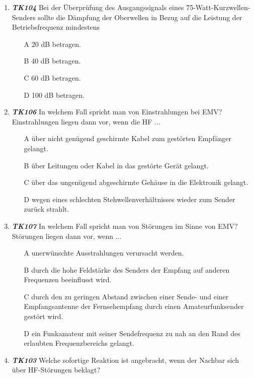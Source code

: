 \begin{enumerate} 
	\item \emph{\textbf{TK104}} Bei der Überprüfung des Ausgangssignals eines 75-Watt-Kurzwellen-Senders sollte die Dämpfung der Oberwellen in Bezug auf die Leistung der Betriebsfrequenz mindestens
	\begin{enumerate}
	\itemsep1pt\parskip0pt
		\item[A] 20 dB betragen.
		\item[B] 40 dB betragen.
		\item[C] 60 dB betragen.
		\item[D] 100 dB betragen.
		\end{enumerate} 
	\item \emph{\textbf{TK106}} In welchem Fall spricht man von Einstrahlungen bei EMV? Einstrahlungen liegen dann vor, wenn die HF ...
	\begin{enumerate}
	\itemsep1pt\parskip0pt
		\item[A] über nicht genügend geschirmte Kabel zum gestörten Empfänger gelangt. 
		\item[B] über Leitungen oder Kabel in das gestörte Gerät gelangt.
		\item[C]   über das ungenügend abgeschirmte Gehäuse in die Elektronik gelangt.
		\item[D]  wegen eines schlechten Stehwellenverhältnisses wieder zum Sender zurück strahlt.
		\end{enumerate}
	\item \emph{\textbf{TK107}} In welchem Fall spricht man von Störungen im Sinne von EMV? Störungen liegen dann vor, wenn ...
	\begin{enumerate}
	\itemsep1pt\parskip0pt
		\item[A] unerwünschte Ausstrahlungen verursacht werden.
		\item[B] durch die hohe Feldstärke des Senders der Empfang auf anderen Frequenzen beeinflusst wird.
		\item[C]  durch den zu geringen Abstand zwischen einer Sende- und einer Empfangsantenne der Fernsehempfang durch einen Amateurfunksender gestört wird.
		\item[D]  ein Funkamateur mit seiner Sendefrequenz zu nah an den Rand des erlaubten Frequenzbereichs gelangt.
		\end{enumerate}
	\item \emph{\textbf{TK103}} Welche sofortige Reaktion ist angebracht, wenn der Nachbar sich über HF-Störungen beklagt?

\end{enumerate}
